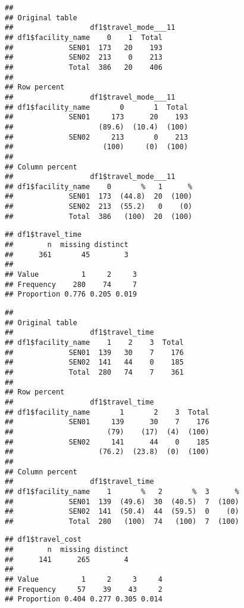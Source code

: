 \documentclass[
]{article}
\begin{document}
\begin{verbatim}
## 
## Original table 
##                  df1$travel_mode___11
## df1$facility_name    0    1  Total
##             SEN01  173   20    193
##             SEN02  213    0    213
##             Total  386   20    406
## 
## Row percent 
##                  df1$travel_mode___11
## df1$facility_name       0       1  Total
##             SEN01     173      20    193
##                    (89.6)  (10.4)  (100)
##             SEN02     213       0    213
##                     (100)     (0)  (100)
## 
## Column percent 
##                  df1$travel_mode___11
## df1$facility_name    0       %   1      %
##             SEN01  173  (44.8)  20  (100)
##             SEN02  213  (55.2)   0    (0)
##             Total  386   (100)  20  (100)
\end{verbatim}

\begin{verbatim}
## df1$travel_time 
##        n  missing distinct 
##      361       45        3 
##                             
## Value          1     2     3
## Frequency    280    74     7
## Proportion 0.776 0.205 0.019
\end{verbatim}

\begin{verbatim}
## 
## Original table 
##                  df1$travel_time
## df1$facility_name    1    2    3  Total
##             SEN01  139   30    7    176
##             SEN02  141   44    0    185
##             Total  280   74    7    361
## 
## Row percent 
##                  df1$travel_time
## df1$facility_name       1       2    3  Total
##             SEN01     139      30    7    176
##                      (79)    (17)  (4)  (100)
##             SEN02     141      44    0    185
##                    (76.2)  (23.8)  (0)  (100)
## 
## Column percent 
##                  df1$travel_time
## df1$facility_name    1       %   2       %  3      %
##             SEN01  139  (49.6)  30  (40.5)  7  (100)
##             SEN02  141  (50.4)  44  (59.5)  0    (0)
##             Total  280   (100)  74   (100)  7  (100)
\end{verbatim}

\begin{verbatim}
## df1$travel_cost 
##        n  missing distinct 
##      141      265        4 
##                                   
## Value          1     2     3     4
## Frequency     57    39    43     2
## Proportion 0.404 0.277 0.305 0.014
\end{verbatim}
\end{document}

